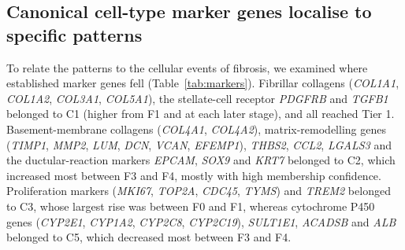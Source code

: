 \documentclass[11pt,a4paper]{article}
\begin{document}
\subsection*{Canonical cell-type marker genes localise to specific patterns}
To relate the patterns to the cellular events of fibrosis, we examined where established marker genes fell (Table~\ref{tab:markers}). Fibrillar collagens (\textit{COL1A1}, \textit{COL1A2}, \textit{COL3A1}, \textit{COL5A1}), the stellate-cell receptor \textit{PDGFRB} and \textit{TGFB1} belonged to C1 (higher from F1 and at each later stage), and all reached Tier 1. Basement-membrane collagens (\textit{COL4A1}, \textit{COL4A2}), matrix-remodelling genes (\textit{TIMP1}, \textit{MMP2}, \textit{LUM}, \textit{DCN}, \textit{VCAN}, \textit{EFEMP1}), \textit{THBS2}, \textit{CCL2}, \textit{LGALS3} and the ductular-reaction markers \textit{EPCAM}, \textit{SOX9} and \textit{KRT7} belonged to C2, which increased most between F3 and F4, mostly with high membership confidence. Proliferation markers (\textit{MKI67}, \textit{TOP2A}, \textit{CDC45}, \textit{TYMS}) and \textit{TREM2} belonged to C3, whose largest rise was between F0 and F1, whereas cytochrome P450 genes (\textit{CYP2E1}, \textit{CYP1A2}, \textit{CYP2C8}, \textit{CYP2C19}), \textit{SULT1E1}, \textit{ACADSB} and \textit{ALB} belonged to C5, which decreased most between F3 and F4.
\end{document}
